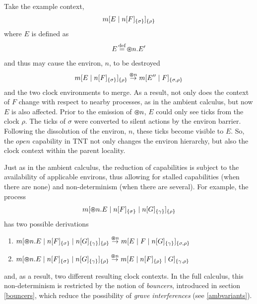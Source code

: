 Take the example context,
\begin{equation}
{m}[ E\;|\;{n}[ F ]_{\{\sigma\}} ]_{\{\rho\}}
\end{equation}
where $E$ is defined as
\begin{equation}
E \operatorname{\stackrel{\textrm{def}}{=}} \varoast n.E^\prime
\end{equation}
and thus may cause the environ, $n$, to be destroyed
\begin{equation}
{m}[ E\;|\;{n}[ F ]_{\{\sigma\}} ]_{\{\rho\}} \stackrel{\varoast n}{\rightarrow}
{m}[ E'^\prime\;|\;F ]_{\{\sigma, \rho\}}
\end{equation}
and the two clock environments to merge.  As a result, not
only does the context of $F$ change with respect to nearby processes, as
in the ambient calculus, but now $E$ is also affected.  Prior to the
emission of $\varoast n$, $E$ could only see ticks from the clock
$\rho$.  The ticks of $\sigma$ were converted to silent actions by the
environ barrier.  Following the dissolution of the environ, $n$, these
ticks become visible to $E$.  So, the $open$ capability in TNT not only
changes the environ hierarchy, but also the clock context within the
parent locality.

Just as in the ambient calculus, the reduction of capabilities is
subject to the availability of applicable environs, thus allowing for
stalled capabilities (when there are none) and non-determinism (when
there are several). For example, the process
\begin{equation}
{m}[ \varoast n.E\;|\;{n}[ F ]_{\{\sigma\}}\;|\;{n}[ G ]_{\{\gamma\}} ]_{\{\rho\}}
\end{equation}
has two possible derivations

\begin{enumerate}
\item
      ${m}[ \varoast n.E\;|\;{n}[ F ]_{\{\sigma\}}\;|\;{n}[ G ]_{\{\gamma\}} ]_{\{\rho\}}
      \stackrel{\varoast n}{\rightarrow} {m}[ E \;|\; F \;|\;
      {n}[ G ]_{\{\gamma\}} ]_{\{\sigma , \rho\}}$
\item
      ${m}[ \varoast n.E\;|\;{n}[ F ]_{\{\sigma\}}\;|\;{n}[ G ]_{\{\gamma\}} ]_{\{\rho\}}
      \stackrel{\varoast n}{\rightarrow} {m}[ E \;|\; {n}[ F ]_{\{\rho\}} \;|\; G ]_{\{\gamma , \rho\}}$
\end{enumerate}
and, as a result, two different resulting clock contexts.  In
the full calculus, this non-determinism is restricted by the notion of
\emph{bouncers}, introduced in section \ref{bouncers}, which reduce the possibility of \emph{grave interferences} (see \ref{ambvariants}).  

